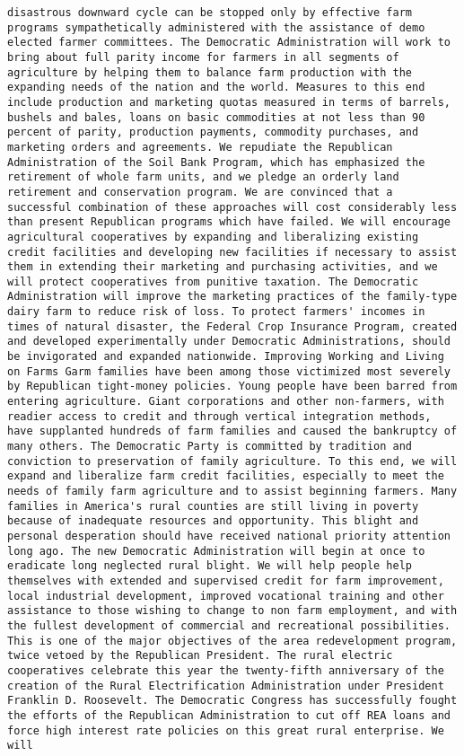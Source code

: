 \documentclass[
]{article}
\begin{document}
\begin{verbatim}
disastrous downward cycle can be stopped only by effective farm programs sympathetically administered with the assistance of demo elected farmer committees. The Democratic Administration will work to bring about full parity income for farmers in all segments of agriculture by helping them to balance farm production with the expanding needs of the nation and the world. Measures to this end include production and marketing quotas measured in terms of barrels, bushels and bales, loans on basic commodities at not less than 90 percent of parity, production payments, commodity purchases, and marketing orders and agreements. We repudiate the Republican Administration of the Soil Bank Program, which has emphasized the retirement of whole farm units, and we pledge an orderly land retirement and conservation program. We are convinced that a successful combination of these approaches will cost considerably less than present Republican programs which have failed. We will encourage agricultural cooperatives by expanding and liberalizing existing credit facilities and developing new facilities if necessary to assist them in extending their marketing and purchasing activities, and we will protect cooperatives from punitive taxation. The Democratic Administration will improve the marketing practices of the family-type dairy farm to reduce risk of loss. To protect farmers' incomes in times of natural disaster, the Federal Crop Insurance Program, created and developed experimentally under Democratic Administrations, should be invigorated and expanded nationwide. Improving Working and Living on Farms Garm families have been among those victimized most severely by Republican tight-money policies. Young people have been barred from entering agriculture. Giant corporations and other non-farmers, with readier access to credit and through vertical integration methods, have supplanted hundreds of farm families and caused the bankruptcy of many others. The Democratic Party is committed by tradition and conviction to preservation of family agriculture. To this end, we will expand and liberalize farm credit facilities, especially to meet the needs of family farm agriculture and to assist beginning farmers. Many families in America's rural counties are still living in poverty because of inadequate resources and opportunity. This blight and personal desperation should have received national priority attention long ago. The new Democratic Administration will begin at once to eradicate long neglected rural blight. We will help people help themselves with extended and supervised credit for farm improvement, local industrial development, improved vocational training and other assistance to those wishing to change to non farm employment, and with the fullest development of commercial and recreational possibilities. This is one of the major objectives of the area redevelopment program, twice vetoed by the Republican President. The rural electric cooperatives celebrate this year the twenty-fifth anniversary of the creation of the Rural Electrification Administration under President Franklin D. Roosevelt. The Democratic Congress has successfully fought the efforts of the Republican Administration to cut off REA loans and force high interest rate policies on this great rural enterprise. We will 
\end{verbatim}
\end{document}
